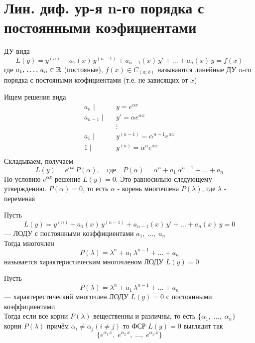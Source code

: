 \section{Лин. диф. ур-я n-го порядка с постоянными коэфициентами}

\begin{Def}
    ДУ вида
    \[
        L(y)=y^{(n)}+a_1(x)\,y^{(n-1)}+a_{n-1}(x)\,y'+\dots+a_n(x)\,y=f(x)
    \]
    где $a_1,\, \dots,\, a_n \in \mathbb{R}$ (постояные), $f(x)\in C_{(a;\,b)}$ называются линейные ДУ $n$-го порядка с постояными коэфициентами (т.е. не зависящих от $x$)
\end{Def}

\begin{Note} [Основа метода реш. ДУ $L(y)=0$]
    Ищем решения вида
    \begin{align*}
        a_n\;| \quad &y=e^{\alpha x} \\
        a_{n-1}\;| \quad &y'=\alpha e^{\alpha x} \\
         &\vdots\\
        a_1\;| \quad &y^{(n-1)}=\alpha^{n-1} e^{\alpha x} \\
        1\;| \quad &y^{(n)}=\alpha^{n} e^{\alpha x} \\ 
    \end{align*}
    Складываем, получаем
    \[
        L(y)=e^{\alpha x}\,P(\alpha), \quad \text{где} \quad P(\alpha)=\alpha^n+a_1\,\alpha^{n-1}+\dots+a_n
    \]
    По условию $e^{\alpha x}$ решение $L(y)=0$. Это равносильно следующему утверждению. $P(\alpha) = 0$, то есть $\alpha$ - корень многочлена $P(\lambda)$, где $\lambda$ - переменая
\end{Note}

\begin{Def}
    Пусть
    \[
        L(y)=y^{(n)}+a_1(x)\,y^{(n-1)}+a_{n-1}(x)\,y'+\dots+a_n(x)\,y=0
    \] 
    --- ЛОДУ с постоянными коэффициентами $a_1,\; \dots,\; a_n$\\
    Тогда многочлен 
    \[
        P(\lambda) = \lambda^n+a_1\,\lambda^{n-1}+\dots+a_n
    \] 
    называется характеристическим многочленом ЛОДУ $L(y)=0$\\
\end{Def}

\begin{Th}
    Пусть
    \[
        P(\lambda) = \lambda^n+a_1\,\lambda^{n-1}+\dots+a_n
    \]
    --- характерестический многочлен ЛОДУ $L(y)=0$ с постоянными коэффициентами\\
    Тогда если все корни $P(\lambda)$ вещественны и различны, то есть $\{\alpha_1,\; \dots,\; \alpha_n\}$ корни $P(\lambda)$ причём $\alpha_i \neq \alpha_j (i \neq j)$ то ФСР $L(y)=0$ выглядит так
    \[
        \{e^{\alpha_1\,x},\; e^{\alpha_2\,x},\; \dots,\; e^{\alpha_n\,x}\}
    \]
\end{Th}

